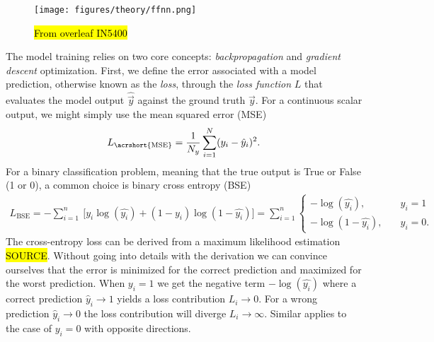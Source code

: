 \begin{figure}[H]
  \centering
  \texttt{[image: figures/theory/ffnn.png]}
  \caption{\hl{From overleaf IN5400}}
  \label{fig:ffnn}
\end{figure}
The model training relies on two core concepts: \textit{backpropagation} and \textit{gradient descent} optimization. First, we define the error associated with a model prediction, otherwise known as the \textit{loss}, through the \textit{loss function} $L$ that evaluates the model output $\hat{\vec{y}}$ against the ground truth $\vec{y}$. For a continuous scalar output, we might simply use the mean squared error (\acrshort{MSE})
\begin{align}
  L_{\text{\acrshort{MSE}}} = \frac{1}{N_y} \sum_{i = 1}^N (y_i - \hat{y}_i)^2.
  \label{eq:MSE}
\end{align}
For a binary classification problem, meaning that the true output is True or False (1 or 0), a common choice is binary cross entropy (BSE)
\begin{align}
  L_{\text{BSE}} =  -\sum_{i=1}^n \ \Big[y_i\log(\hat{y_i}) + (1-y_i)\log(1 - \hat{y_i}) \Big] =  \sum_{i=1}^n   \begin{cases}
    - \log{(\hat{y_i})},& \quad y_i = 1 \\
    -\log{(1-\hat{y_i})},& \quad y_i = 0.
  \label{eq:BSE}
\end{cases}
\end{align}
The cross-entropy loss can be derived from a maximum likelihood estimation \hl{SOURCE}. Without going into details with the derivation we can convince ourselves that the error is minimized for the correct prediction and maximized for the worst prediction. When $y_i = 1$ we get the negative term $-\log(\hat{y_i})$ where a correct prediction $\hat{y}_i \to 1$ yields a loss contribution $L_i \to 0$. For a wrong prediction $\hat{y}_i \to 0$ the loss contribution will diverge $L_i \to \infty$. Similar applies to the case of $y_i = 0$ with opposite directions. 

